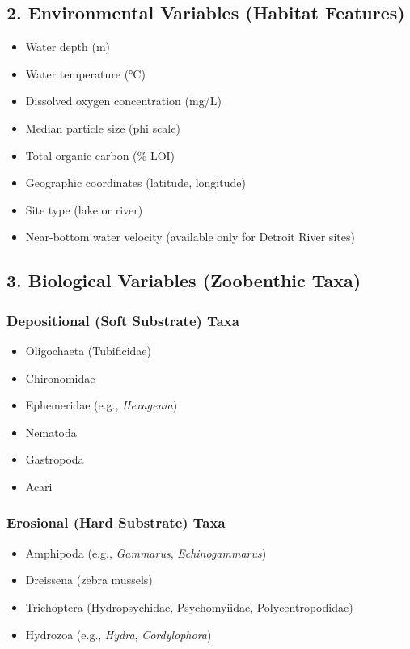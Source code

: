 \subsection*{2. Environmental Variables (Habitat Features)}
\begin{itemize}
    \item Water depth (m)
    \item Water temperature (°C)
    \item Dissolved oxygen concentration (mg/L)
    \item Median particle size (phi scale)
    \item Total organic carbon (\% LOI)
    \item Geographic coordinates (latitude, longitude)
    \item Site type (lake or river)
    \item Near-bottom water velocity (available only for Detroit River sites)
\end{itemize}

\subsection*{3. Biological Variables (Zoobenthic Taxa)}
\subsubsection*{Depositional (Soft Substrate) Taxa}
\begin{itemize}
    \item Oligochaeta (Tubificidae)
    \item Chironomidae
    \item Ephemeridae (e.g., \textit{Hexagenia})
    \item Nematoda
    \item Gastropoda
    \item Acari
\end{itemize}

\subsubsection*{Erosional (Hard Substrate) Taxa}
\begin{itemize}
    \item Amphipoda (e.g., \textit{Gammarus}, \textit{Echinogammarus})
    \item Dreissena (zebra mussels)
    \item Trichoptera (Hydropsychidae, Psychomyiidae, Polycentropodidae)
    \item Hydrozoa (e.g., \textit{Hydra}, \textit{Cordylophora})
\end{itemize}

